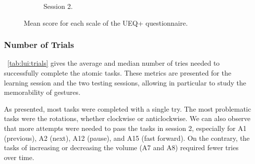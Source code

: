 \begin{figure}[bt]
\begin{subfigure}{.495\linewidth}
        \caption{Session 2.}
        \label{fig:lui:ueqplus-scales:session2}
    \end{subfigure}
    \vspace{-16pt}
    \caption{Mean score for each scale of the UEQ+ questionnaire.}
    \label{fig:lui:ueqplus-scales}
    \vspace{-8pt}
\end{figure}

\subsubsection{Number of Trials}

\tab~\ref{tab:lui:trials} gives the average and median number of tries needed to successfully complete the atomic tasks. These metrics are presented for the learning session and the two testing sessions, allowing in particular to study the memorability of gestures.

As presented, most tasks were completed with a single try. The most problematic tasks were the rotations, whether clockwise or anticlockwise. We can also observe that more attempts were needed to pass the tasks in session 2, especially for A1 (previous), A2 (next), A12 (pause), and A15 (fast forward). On the contrary, the tasks of increasing or decreasing the volume (A7 and A8) required fewer tries over time.

